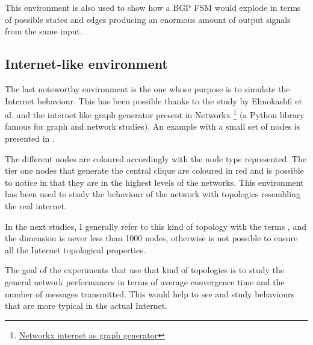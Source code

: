 This environment is also used to show how a \ac{BGP} \ac{FSM} would explode
in terms of possible states and edges producing an enormous amount of
output signals from the same input.

\subsection{Internet-like environment}
\label{subsec:internet_like_env}

The last noteworthy environment is the one whose purpose is to simulate the Internet
behaviour.
This has been possible thanks to the study by Elmokashfi et al. \cite{elmokashfi2010scalability}
and the internet like graph generator present in Networkx \footnote{\href{https://networkx.org/documentation/stable/reference/generated/networkx.generators.internet_as_graphs.random_internet_as_graph.html\#networkx.generators.internet_as_graphs.random_internet_as_graph}{Networkx internet as graph generator}}
(a Python library famous for graph and network studies).
An example with a small set of nodes is presented in .

The different nodes are coloured accordingly with the node type represented.
The tier one nodes that generate the central clique are coloured in red and
is possible to notice in  that they are
in the highest levels of the networks.
This environment has been used to study the behaviour of the network with
topologies resembling the real internet.

In the next studies, I generally refer to this kind of topology with the
terms , and the dimension is never less than \num{1000} nodes,
otherwise is not possible to ensure all the Internet topological properties.

The goal of the experiments that use that kind of topologies is to study
the general network performances in terms of average convergence time and
the number of messages transmitted.
This would help to see and study behaviours that are more typical in the actual
Internet.
